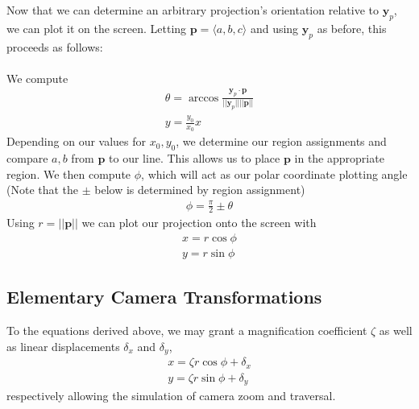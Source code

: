\documentclass{article}
\begin{document}
Now that we can determine an arbitrary projection's orientation relative to $\textbf{y}_p$, we can plot it on the screen. Letting
$\textbf{p} = \langle a,b,c \rangle$ and using $\textbf{y}_p$ as before, this proceeds as follows:
\\\\
We compute
\begin{align*}
\theta = \arccos{\frac{\textbf{y}_p \cdot \textbf{p}}{||\textbf{y}_p|| ||\textbf{p}||}}\\
y = \frac{y_0}{x_0}x
\end{align*}
Depending on our values for $x_0,y_0$, we determine our region assignments and compare $a,b$ from $\textbf{p}$ to our line. This allows us to
place $\textbf{p}$ in the appropriate region. We then compute $\phi$, which will act as our polar coordinate plotting angle
(Note that the $\pm$ below is determined by region assignment)
\begin{align*}
\phi = \frac{\pi}{2} \pm \theta
\end{align*}
Using $r = ||\textbf{p}||$ we can plot our projection onto the screen with
\begin{align*}
x = r\cos \phi\\
y = r\sin \phi
\end{align*}
\subsection{Elementary Camera Transformations}
To the equations derived above, we may grant a magnification coefficient $\zeta$ as well as linear displacements $\delta_x$ and $\delta_y$,
\begin{align*}
x = \zeta r\cos \phi+\delta_x\\
y = \zeta r\sin \phi+\delta_y
\end{align*}
respectively allowing the simulation of camera zoom and traversal.
\end{document}
